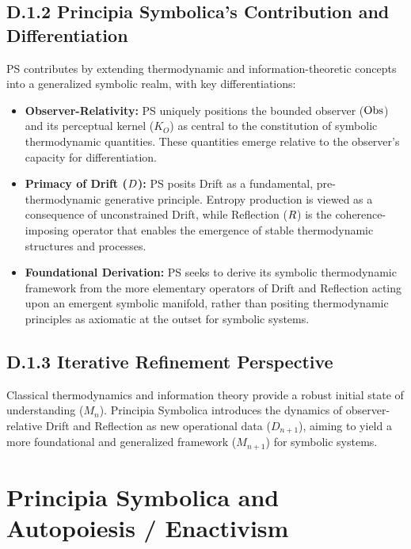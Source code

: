 \subsection*{D.1.2 Principia Symbolica's Contribution and Differentiation} \label{subsec:appD_stat_thermo_contribution_differentiation}
PS contributes by extending thermodynamic and information-theoretic concepts into a generalized symbolic realm, with key differentiations:
\begin{itemize}
    \item \textbf{Observer-Relativity:} PS uniquely positions the bounded observer (\(\mathrm{Obs}\)) and its perceptual kernel (\(K_O\)) as central to the constitution of symbolic thermodynamic quantities. These quantities emerge relative to the observer's capacity for differentiation.
    \item \textbf{Primacy of Drift (\(D\)):} PS posits Drift as a fundamental, pre-thermodynamic generative principle. Entropy production is viewed as a consequence of unconstrained Drift, while Reflection (\(R\)) is the coherence-imposing operator that enables the emergence of stable thermodynamic structures and processes.
    \item \textbf{Foundational Derivation:} PS seeks to derive its symbolic thermodynamic framework from the more elementary operators of Drift and Reflection acting upon an emergent symbolic manifold, rather than positing thermodynamic principles as axiomatic at the outset for symbolic systems.
\end{itemize}
\subsection*{D.1.3 Iterative Refinement Perspective}
\label{subsec:appD_stat_thermo_iterative_refinement_perspective}
Classical thermodynamics and information theory provide a robust initial state of understanding (\(M_n\)). Principia Symbolica introduces the dynamics of observer-relative Drift and Reflection as new operational data (\(D_{n+1}\)), aiming to yield a more foundational and generalized framework (\(M_{n+1}\)) for symbolic systems.
\section*{Principia Symbolica and Autopoiesis / Enactivism} \label{sec:appD_ps_and_autopoiesis_enactivism}

